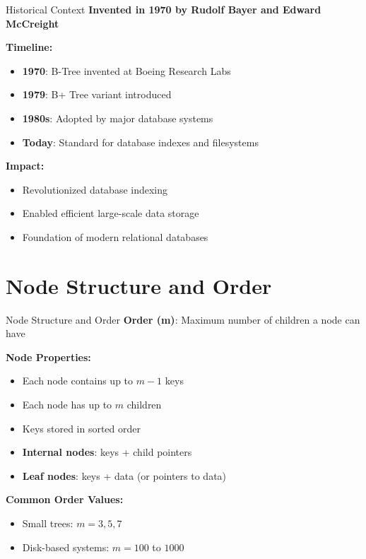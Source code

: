 \documentclass[aspectratio=169]{beamer}
\begin{document}
\begin{frame}{Historical Context}
  \textbf{Invented in 1970 by Rudolf Bayer and Edward McCreight}

  \vspace{0.3cm}
  \textbf{Timeline:}
  \begin{itemize}
    \item \textbf{1970}: B-Tree invented at Boeing Research Labs
    \item \textbf{1979}: B+ Tree variant introduced
    \item \textbf{1980s}: Adopted by major database systems
    \item \textbf{Today}: Standard for database indexes and filesystems
  \end{itemize}

  \vspace{0.3cm}
  \textbf{Impact:}
  \begin{itemize}
    \item Revolutionized database indexing
    \item Enabled efficient large-scale data storage
    \item Foundation of modern relational databases
  \end{itemize}
\end{frame}

\section{Node Structure and Order}

\begin{frame}{Node Structure and Order}
  \textbf{Order (m)}: Maximum number of children a node can have

  \vspace{0.3cm}
  \textbf{Node Properties:}
  \begin{itemize}
    \item Each node contains up to $m-1$ keys
    \item Each node has up to $m$ children
    \item Keys stored in sorted order
    \item \textbf{Internal nodes}: keys + child pointers
    \item \textbf{Leaf nodes}: keys + data (or pointers to data)
  \end{itemize}

  \vspace{0.3cm}
  \textbf{Common Order Values:}
  \begin{itemize}
    \item Small trees: $m = 3, 5, 7$
    \item Disk-based systems: $m = 100$ to $1000$
  \end{itemize}
\end{frame}
\end{document}
